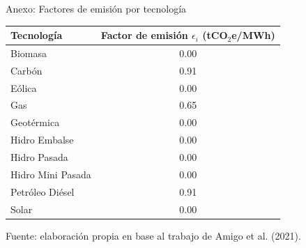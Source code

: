 \documentclass[xcolor=dvipsnames]{beamer}
\begin{document}
\begin{frame}{Anexo: Factores de emisión por tecnología}

\centering

\renewcommand{\arraystretch}{1.15}
\setlength{\tabcolsep}{12pt}

\begin{table}
\centering
\small
\begin{tabular}{l c}
\toprule
\textbf{Tecnología} & \textbf{Factor de emisión $\epsilon_i$ (tCO$_2$e/MWh)} \\
\midrule
Biomasa            & 0.00 \\
Carbón             & 0.91 \\
Eólica             & 0.00 \\
Gas                & 0.65 \\
Geotérmica         & 0.00 \\
Hidro Embalse      & 0.00 \\
Hidro Pasada       & 0.00 \\
Hidro Mini Pasada  & 0.00 \\
Petróleo Diésel    & 0.91 \\
Solar              & 0.00 \\
\bottomrule
\end{tabular}
\end{table}

\vspace{0.15cm}

{\footnotesize Fuente: elaboración propia en base al trabajo de Amigo et al. (2021).}

\end{frame}
\end{document}
